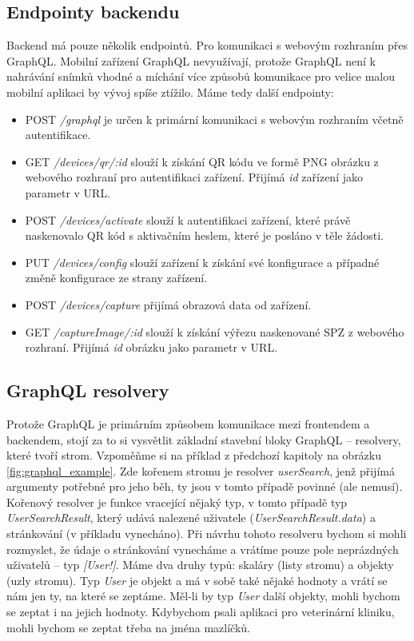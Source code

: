 \subsection{Endpointy backendu} \label{endpoints}

\noindent
Backend má pouze několik endpointů. Pro komunikaci s webovým rozhraním přes GraphQL.
Mobilní zařízení GraphQL nevyužívají, protože GraphQL není k nahrávání snímků vhodné a míchání více způsobů
komunikace pro velice malou mobilní aplikaci by vývoj spíše ztížilo. Máme tedy další endpointy:

\begin{itemize}
  \setlength\itemsep{.05em}
  \item POST \textit{/graphql} je určen k primární komunikaci s webovým rozhraním včetně autentifikace.
  \item GET \textit{/devices/qr/:id} slouží k získání QR kódu ve formě PNG obrázku z webového rozhraní pro autentifikaci zařízení.
        Přijímá \textit{id} zařízení jako parametr v URL.
  \item POST \textit{/devices/activate} slouží k autentifikaci zařízení, které právě naskenovalo QR kód s aktivačním heslem, které je posláno v těle žádosti.
  \item PUT \textit{/devices/config} slouží zařízení k získání své konfigurace a případné změně konfigurace ze strany zařízení.
  \item POST \textit{/devices/capture} přijímá obrazová data od zařízení.
  \item GET \textit{/captureImage/:id} slouží k získání výřezu naskenované SPZ z webového rozhraní. Přijímá \textit{id} obrázku jako parametr v URL.
\end{itemize}

\subsection{GraphQL resolvery}

\noindent
Protože GraphQL je primárním způsobem komunikace mezi frontendem a backendem, stojí za to si vysvětlit základní stavební bloky
GraphQL -- resolvery, které tvoří strom. Vzpoměňme si na příklad z předchozí kapitoly na obrázku \ref{fig:graphql_example}.
Zde kořenem stromu je resolver \textit{userSearch}, jenž přijímá argumenty potřebné pro jeho běh, ty jsou v tomto případě
povinné (ale nemusí). Kořenový resolver je funkce vracející nějaký typ, v tomto případě typ \textit{UserSearchResult}, který udává nalezené
uživatele (\textit{UserSearchResult.data}) a stránkování (v příkladu vynecháno).
Při návrhu tohoto resolveru bychom si mohli rozmyslet, že údaje o stránkování vynecháme a vrátíme pouze
pole neprázdných uživatelů -- typ \textit{[User!]}.
Máme dva druhy typů: skaláry (listy stromu) a objekty (uzly stromu).
Typ \textit{User} je objekt a má v sobě také nějaké hodnoty a vrátí se nám jen ty, na které se zeptáme. Měl-li by typ \textit{User}
další objekty, mohli bychom se zeptat i na jejich hodnoty. Kdybychom psali aplikaci pro veterinární kliniku, mohli bychom se zeptat
třeba na jména mazlíčků.

